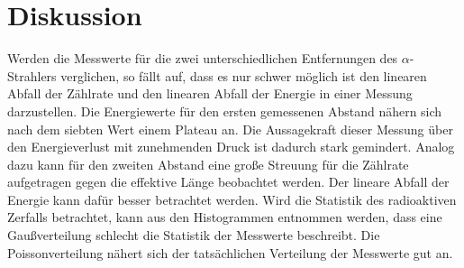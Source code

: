 \section{Diskussion}
\label{sec:Diskussion}
Werden die Messwerte für die zwei unterschiedlichen Entfernungen des $\alpha$-Strahlers verglichen, so fällt auf, dass es nur schwer möglich ist den linearen Abfall der Zählrate und den linearen Abfall der Energie in einer Messung darzustellen.
Die Energiewerte für den ersten gemessenen Abstand nähern sich nach dem siebten Wert einem Plateau an.
Die Aussagekraft dieser Messung über den Energieverlust mit zunehmenden Druck ist dadurch stark gemindert.
Analog dazu kann für den zweiten Abstand eine große Streuung für die Zählrate aufgetragen gegen die effektive Länge beobachtet werden.
Der lineare Abfall der Energie kann dafür besser betrachtet werden.
Wird die Statistik des radioaktiven Zerfalls betrachtet, kann aus den Histogrammen entnommen werden, dass eine Gaußverteilung schlecht die Statistik der Messwerte beschreibt.
Die Poissonverteilung nähert sich der tatsächlichen Verteilung der Messwerte gut an.
